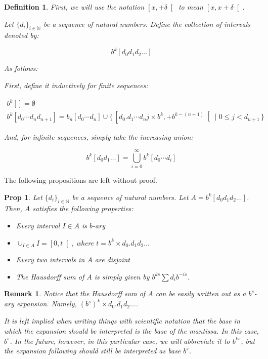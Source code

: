 \documentclass[11pt]{amsart}
\newcommand{\N}{\mathbb{N}}
\newtheorem{prop}{Prop}
\newtheorem{definition}{Definition}
\newtheorem{remark}{Remark}
\begin{document}
\begin{definition}
First, we will use the notation $\left[ x, +\delta \right[$ to mean $\left[x, x+\delta \right[$.

Let $\{d_i\}_{i \in \N}$ be a sequence of natural numbers. Define the collection of intervals denoted by:

\[ b^k [d_0 d_1 d_2 \dots] \]

As follows:

First, define it inductively for finite sequences:

\begin{gather*}
b^k [] = \emptyset\\
b^k [d_0 \cdots d_n d_{n+1}] = b_n [d_0 \cdots d_n] \cup \{\,\left[d_0 . d_1 \cdots d_n j \times b^k, +b^{k-(n+1)} \right[ \mid 0 \leq j < d_{n+1} \,\}
\end{gather*}

And, for infinite sequences, simply take the increasing union:

\[ b^k[d_0 d_1 \dots] = \bigcup_{i = 0}^\infty b^k[d_0 \cdots d_i] \]

\end{definition}

The following propositions are left without proof.

\begin{prop}
Let $\{d_i\}_{i \in \N}$ be a sequence of natural numbers. Let $A = b^k [d_0 d_1 d_2 \dots]$. Then, $A$ satisfies the following properties:

\begin{itemize}
\item Every interval $I \in A$ is $b$-ary

\item $\cup_{I \in A} I = \left[ 0, t \right[$, where $t = b^k \times d_0 . d_1 d_2 \dots$

\item Every two intervals in $A$ are disjoint

\item The Hausdorff sum of $A$ is simply given by $b^{ks} \sum d_i b^{-is}$.
\end{itemize}

\end{prop}

\begin{remark}
Notice that the Hausdorff sum of $A$ can be easily written out as a $b^s$-ary expansion. Namely, $(b^s)^k \times d_0 . d_1 d_ 2 \dots$.

It is left implied when writing things with scientific notation that the base in which the expansion should be interpreted is the base of the mantissa. In this case, $b^s$. In the future, however, in this particular case, we will abbreviate it to $b^{ks}$, but the expansion following should still be interpreted as base $b^s$.
\end{remark}
\end{document}

